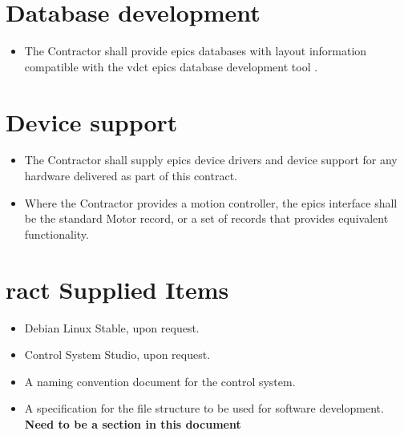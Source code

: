 \documentclass[11pt
  , a4paper
  , article
  , oneside
]{memoir}
\begin{document}
\section{Database development}
\begin{itemize}
  \item The Contractor shall provide \Gls{epics} databases with layout information compatible with the \Gls{vdct} \Gls{epics} database development tool \cite{vdct}.
\end{itemize}


\section{Device support}
\begin{itemize}
\item The Contractor shall supply \Gls{epics} device drivers and device support for any hardware delivered as part of this contract.
\item Where the Contractor provides a motion controller, the \Gls{epics} interface shall be the standard Motor record, or a set of records that provides equivalent functionality.
\end{itemize}

\section{\Gls{ract} Supplied Items}
\begin{itemize}
\item Debian Linux Stable, upon request.
\item Control System Studio, upon request.
\item A naming convention document for the control system.
\item A specification for the file structure to be used for software development. \textbf{Need to be a section in this document}
\end{itemize}
\end{document}
